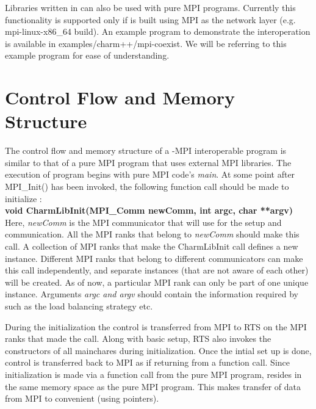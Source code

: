 Libraries written in \charmpp{} can also be used with pure MPI programs. Currently this
functionality is supported only if \charmpp{} is built using MPI as the network layer
(e.g. mpi-linux-x86\_64 build). An example program to demonstrate the
interoperation is available in examples/charm++/mpi-coexist. We will be
referring to this example program for ease of understanding.

\section{Control Flow and Memory Structure}
The control flow and memory structure of a \charmpp{}-MPI interoperable program  is
similar to that of a pure MPI program that uses external MPI libraries. The
execution of program begins with pure MPI code's {\em main}. At some point after 
MPI\_Init() has been invoked, the following function call should be made to initialize
\charmpp{}: \\

{\bf void CharmLibInit(MPI\_Comm newComm, int argc, char **argv)}\\

\noindent Here, {\em newComm} is the MPI communicator that \charmpp{} will use for
the setup and communication. All the MPI ranks that belong to {\em newComm} should 
make this call. A collection of MPI ranks that make the CharmLibInit call defines a 
new \charmpp{} instance. Different MPI ranks that belong to different communicators can 
make this call independently, and separate \charmpp{} instances (that are not aware of each other) 
will be created. As of now, a particular MPI rank can only be part of one unique \charmpp{} 
instance. Arguments {\em argc and argv} should contain the information required by \charmpp{} 
such as the load balancing strategy etc.

During the initialization the control is transferred from MPI to \charmpp{}
RTS on the MPI ranks that made the call. Along with basic setup, \charmpp{} RTS also invokes
the constructors of all mainchares during initialization. Once the intial set up
is done, control is transferred back to MPI as if returning from a function call. 
Since \charmpp{} initialization is made via a function call from the pure MPI
program, \charmpp{} resides in the same memory space as the pure MPI program. This
makes transfer of data from MPI to \charmpp{} convenient (using pointers).

